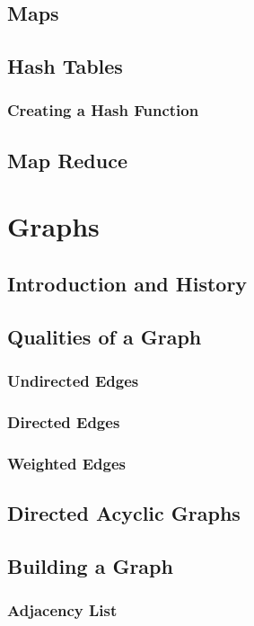 \documentclass[10pt,a4paper]{book}
\begin{document}
\section{Maps}
\section{Hash Tables}
\subsection{Creating a Hash Function}
\section{Map Reduce}


\chapter{Graphs}
\section{Introduction and History}


\section{Qualities of a Graph}

\subsection{Undirected Edges}

\subsection{Directed Edges}

\subsection{Weighted Edges}

\section{Directed Acyclic Graphs}


\section{Building a Graph}

\subsection{Adjacency List}
\end{document}
